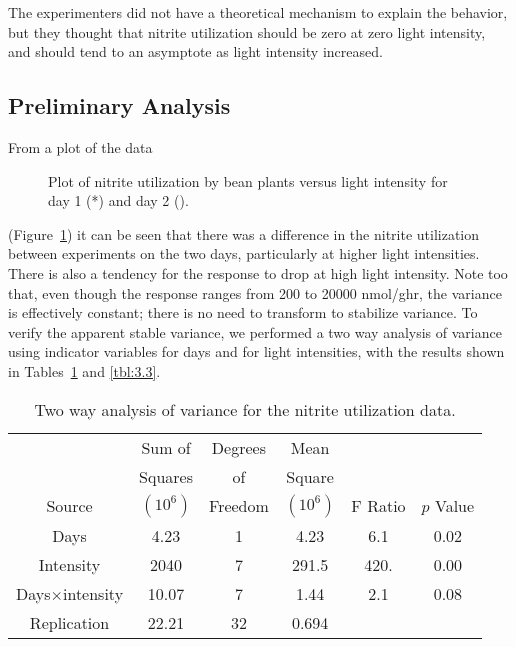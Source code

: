 The experimenters did not have a theoretical mechanism to explain
the behavior, but they thought that nitrite utilization should be
zero at zero light intensity, and should tend to an asymptote as
light intensity increased.
\subsection{Preliminary Analysis}

From a plot of the data
\begin{figure}
  \vspace{3in}
  \caption{Plot of nitrite utilization by bean plants
    versus light intensity for day 1 (*) and day 2 ().}
  \label{fig:NITdata}
\end{figure}
(Figure~\ref{fig:NITdata}) it can be seen that there
was a difference in the nitrite utilization
between experiments on the two days,
particularly at higher light intensities.
There is also a tendency for the response to drop at high light
intensity.
Note too that, even though the response ranges from 200 to 20000
nmol/ghr, the variance is effectively constant;  there is no
need to transform to stabilize variance.
To verify the apparent stable variance, we performed a two way
analysis of variance using indicator variables for days and for
light intensities, with the results shown in
Tables~\ref{tbl:3.2} and \ref{tbl:3.3}.
\begin{table}
  \caption{
  Two way analysis of variance for the nitrite utilization data.
  }\label{tbl:3.2}
  \begin{center}
    \begin{tabular}{cccccc}\hline
      &\multicolumn{1}{c}{Sum of} & \multicolumn{1}{c}{Degrees}
      &\multicolumn{1}{c}{Mean}\\ & \multicolumn{1}{c}{Squares} &
      \multicolumn{1}{c}{of} &\multicolumn{1}{c}{Square}\\
      \multicolumn{1}{c}{Source} & \multicolumn{1}{c}{$( 10^6 )$} &
      \multicolumn{1}{c}{Freedom} & \multicolumn{1}{c}{$( 10^6 )$} &
      \multicolumn{1}{c}{F Ratio} & \multicolumn{1}{c}{$p$ Value}\\ \hline
      Days&4.23&1&4.23&6.1&0.02\\
      Intensity&2040&7&291.5&420.&0.00\\
      Days$\times$intensity&10.07&7&1.44&2.1&0.08\\ \hline
      Replication&22.21&32&0.694\\ \hline
    \end{tabular}
  \end{center}
\end{table}
